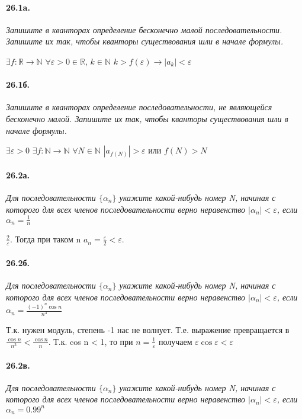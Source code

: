 \documentclass{book}
\begin{document}
\paragraph{26.1a.}
\textit{Запишите в кванторах определение бесконечно малой последовательности. Запишите их так, чтобы кванторы
существования шли в начале формулы.}

$\exists f: \mathbb{R} \to \mathbb{N}$ $\forall \varepsilon > 0 \in \mathbb{R}$, $k \in \mathbb{N}$ $k>f(\varepsilon) \rightarrow |a_k| < \varepsilon$

\paragraph{26.1б.}
\textit{Запишите в кванторах определение последовательности, не являющейся бесконечно малой. Запишите их так, чтобы кванторы
существования шли в начале формулы.}

$\exists \varepsilon > 0$ $\exists f: \mathbb{N} \to \mathbb{N}$ $\forall N \in \mathbb{N}$ $|a_{f(N)}| > \varepsilon$ или $f(N) > N$

\paragraph{26.2а.}
\textit{Для последовательности $\{\alpha_n\}$ укажите какой-нибудь номер N, начиная с которого для всех членов последовательности верно неравенство $|\alpha_n| < \varepsilon$, если $\alpha_n = \frac{1}{n}$}

$\frac{2}{\varepsilon}$. Тогда при таком n $a_n = \frac{\varepsilon}{2} < \varepsilon$.

\paragraph{26.2б.}
\textit{Для последовательности $\{\alpha_n\}$ укажите какой-нибудь номер N, начиная с которого для всех членов последовательности верно неравенство $|\alpha_n| < \varepsilon$, если $\alpha_n = \frac{(-1)^n \cos n}{n^3}$}

Т.к. нужен модуль, степень -1 нас не волнует. Т.е. выражение превращается в $\frac{\cos n}{n^3} < \frac{\cos n}{n}$. Т.к. cos n < 1, то при $n=\frac{1}{\varepsilon} $ получаем $\varepsilon \cos \varepsilon < \varepsilon$ 

\paragraph{26.2в.}
\textit{Для последовательности $\{\alpha_n\}$ укажите какой-нибудь номер N, начиная с которого для всех членов последовательности верно неравенство $|\alpha_n| < \varepsilon$, если $\alpha_n = 0.99^n$}
\end{document}
